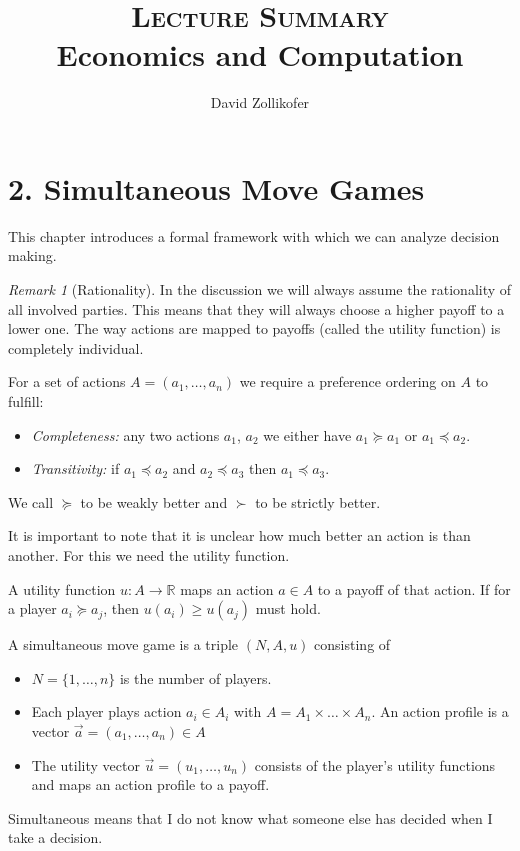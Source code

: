 \documentclass[12pt]{article}
\title{\textsc{\large Lecture Summary}\\Economics and Computation }
\author{David Zollikofer}
\theoremstyle{definition}
\theoremstyle{remark}
\newtheorem*{remark}{Remark}
\newcommand{\R}{\mathbb{R}}
\begin{document}
	\maketitle
	
\section*{2. Simultaneous Move Games}
This chapter introduces a formal framework with which we can analyze decision making. 

\begin{remark}[Rationality]
In the discussion we will always assume the rationality of all involved parties. This means that they will always choose a higher payoff to a lower one. The way actions are mapped to payoffs (called the utility function) is completely individual.
\end{remark}

\begin{definition}
	For a set of actions $A = (a_1,\ldots, a_n)$ we require a preference ordering on $A$ to fulfill:
	\begin{itemize}
		\item \textit{Completeness:} any two actions $a_1$, $a_2$ we either have $a_1 \succeq a_1$ or $a_1 \preceq a_2$.
		\item \textit{Transitivity:} if $a_1 \preceq a_2$ and $a_2 \preceq a_3$ then $a_1 \preceq a_3$.
	\end{itemize}
	We call $\succeq$ to be weakly better and $\succ$ to be strictly better.
\end{definition}
It is important to note that it is unclear how much better an action is than another. For this we need the utility function.
\begin{definition}
	A utility function $u:A\to \R$ maps an action $a\in A$ to a payoff of that action. If for a player $a_i \succeq a_j$, then $u(a_i) \geq u(a_j)$ must hold.
\end{definition}

\begin{definition}
A simultaneous move game is a triple $(N,A,u)$ consisting of 
\begin{itemize}
	\item $N = \{1,\ldots,n\}$ is the number of players.
	\item Each player plays action $a_i \in A_i$ with $A = A_1 \times \ldots \times A_n$. An action profile is a vector $\vec{a} = (a_1,\ldots,a_n)\in A$
	\item The utility vector $\vec{u} = (u_1,\ldots,u_n)$ consists of the player's utility functions and maps an action profile to a payoff.
\end{itemize}
Simultaneous means that I do not know what someone else has decided when I take a decision.
\end{definition}
\end{document}
